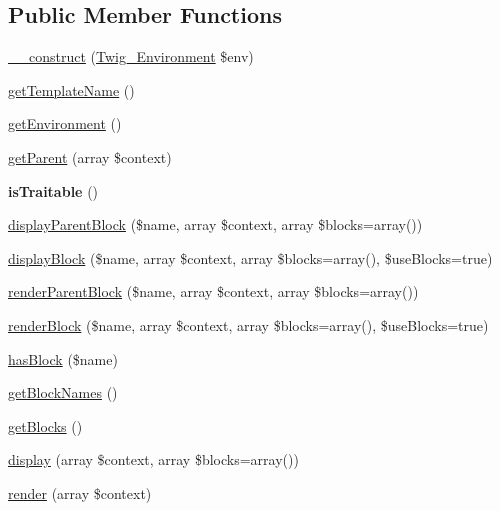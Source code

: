 \subsection*{Public Member Functions}
\begin{DoxyCompactItemize}
\item 
\hyperlink{class_twig___template_a4f8326243132c1450a81e0a817aa1be7}{\+\_\+\+\_\+construct} (\hyperlink{class_twig___environment}{Twig\+\_\+\+Environment} \$env)
\item 
\hyperlink{class_twig___template_a621a3ccd148ed8b9e937da6959c98f39}{get\+Template\+Name} ()
\item 
\hyperlink{class_twig___template_a1a945689f9a90f9029d671ec32262d37}{get\+Environment} ()
\item 
\hyperlink{class_twig___template_a4217d54e053aa5bddfad17b3004ac5c1}{get\+Parent} (array \$context)
\item 
\hypertarget{class_twig___template_aa9eb89be270f6afc256ef5e272b78a63}{}{\bfseries is\+Traitable} ()\label{class_twig___template_aa9eb89be270f6afc256ef5e272b78a63}

\item 
\hyperlink{class_twig___template_a78d5485612f79bf31635bb68a7b7de13}{display\+Parent\+Block} (\$name, array \$context, array \$blocks=array())
\item 
\hyperlink{class_twig___template_a97ea25cc61cdde9281668bf860771c94}{display\+Block} (\$name, array \$context, array \$blocks=array(), \$use\+Blocks=true)
\item 
\hyperlink{class_twig___template_a7c48e16aed21e0e9ea0d9bfbf6528a72}{render\+Parent\+Block} (\$name, array \$context, array \$blocks=array())
\item 
\hyperlink{class_twig___template_a39ed303baa07a0f8d7dc26d1ecc39fb9}{render\+Block} (\$name, array \$context, array \$blocks=array(), \$use\+Blocks=true)
\item 
\hyperlink{class_twig___template_ade38e8b97bc678e012017eaec7594585}{has\+Block} (\$name)
\item 
\hyperlink{class_twig___template_ad3fa0b6c6a34ecc42f64666da6c9c017}{get\+Block\+Names} ()
\item 
\hyperlink{class_twig___template_a14e746abf913beb2363836303549228d}{get\+Blocks} ()
\item 
\hyperlink{class_twig___template_a056b93bf930a9629d3a96234ce462f20}{display} (array \$context, array \$blocks=array())
\item 
\hyperlink{class_twig___template_a09fce96a9866b9a2bcba80d611c0199c}{render} (array \$context)
\end{DoxyCompactItemize}
